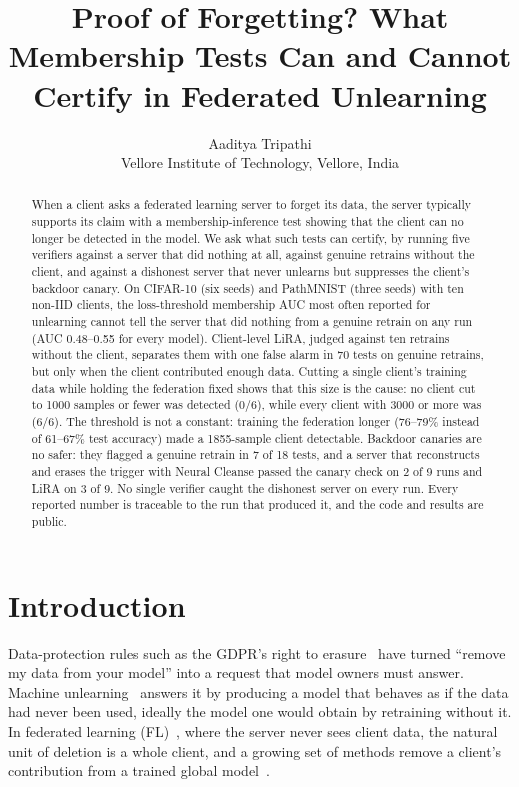 \documentclass[11pt]{article}
\title{Proof of Forgetting? What Membership Tests Can and Cannot Certify in Federated Unlearning}
\author{Aaditya Tripathi\\[2pt]\normalsize Vellore Institute of Technology, Vellore, India}
\date{}
\begin{document}
\maketitle

\begin{abstract}
When a client asks a federated learning server to forget its data, the server
typically supports its claim with a membership-inference test showing that the
client can no longer be detected in the model. We ask what such tests can
certify, by running five verifiers against a server that did nothing at all,
against genuine retrains without the client, and against a dishonest server
that never unlearns but suppresses the client's backdoor canary. On CIFAR-10
(six seeds) and PathMNIST (three seeds) with ten non-IID clients, the
loss-threshold membership AUC most often reported for unlearning cannot tell
the server that did nothing from a genuine retrain on any run (AUC 0.48--0.55
for every model). Client-level LiRA, judged against ten retrains without the
client, separates them with one false alarm in 70 tests on genuine retrains,
but only when the client contributed enough data. Cutting a single client's
training data while holding the federation fixed shows that this size is the
cause: no client cut to 1000 samples or fewer was detected (0/6), while every
client with 3000 or more was (6/6). The threshold is not a constant: training
the federation longer (76--79\% instead of 61--67\% test accuracy) made a
1855-sample client detectable. Backdoor canaries are no safer: they flagged a
genuine retrain in 7 of 18 tests, and a server that reconstructs and erases the
trigger with Neural Cleanse passed the canary check on 2 of 9 runs and LiRA on
3 of 9. No single verifier caught the dishonest server on every run. Every
reported number is traceable to the run that produced it, and the code and
results are public.
\end{abstract}

\section{Introduction}

Data-protection rules such as the GDPR's right to erasure~\cite{gdpr} have
turned ``remove my data from your model'' into a request that model owners must
answer. Machine unlearning~\cite{cao2015,bourtoule2021} answers it by producing
a model that behaves as if the data had never been used, ideally the model one
would obtain by retraining without it. In federated learning
(FL)~\cite{mcmahan2017}, where the server never sees client data, the natural
unit of deletion is a whole client, and a growing set of methods remove a
client's contribution from a trained global
model~\cite{liu2021federaser,halimi2022}.
\end{document}

